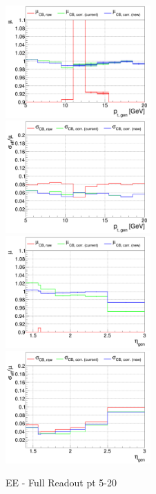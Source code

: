 \begin{figure}
\includegraphics[width=0.495\textwidth]{./plots_pdf/ECAL_plots/plotsNoPU/EE/pdf/FULL/GENPT/EEFULL_GENPT_0005_0020_MuOverBins.pdf}
\includegraphics[width=0.495\textwidth]{./plots_pdf/ECAL_plots/plotsNoPU/EE/pdf/FULL/GENPT/EEFULL_GENPT_0005_0020_EffSigmaOverBins.pdf}
\includegraphics[width=0.495\textwidth]{./plots_pdf/ECAL_plots/plotsNoPU/EE/pdf/FULL/GENETA/EEFULL_GENETA_0005_0020_MuOverBins.pdf}
\includegraphics[width=0.495\textwidth]{./plots_pdf/ECAL_plots/plotsNoPU/EE/pdf/FULL/GENETA/EEFULL_GENETA_0005_0020_EffSigmaOverBins.pdf}
\caption{EE - Full Readout pt 5-20}
\end{figure}


